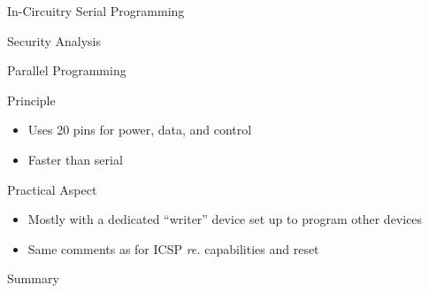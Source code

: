 \begin{reveals}
\begin{frame}{In-Circuitry Serial Programming}
\begin{block}{Security Analysis}
\begin{itemize}
    \end{itemize}
  \end{block}

\end{frame}


\begin{frame}[c]{Parallel Programming}
  
  \begin{block}{Principle}
    \begin{itemize}
    \item Uses 20 pins for power, data, and control
    \item Faster than serial
    \end{itemize}
  \end{block}

  \vfill

  \begin{block}{Practical Aspect}
    \begin{itemize}
    \item Mostly with a dedicated ``writer'' device set up to program
      other devices
    \item Same comments as for ICSP \textit{re.} capabilities and
      reset
    \end{itemize}
  \end{block}

\end{frame}


\begin{frame}[c]{Summary}
  

\end{frame}
\end{reveals}
